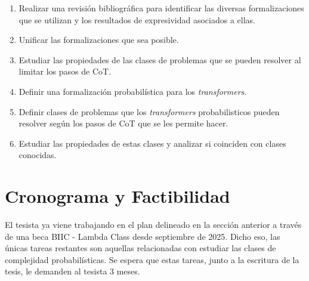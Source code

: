 \documentclass[a4paper,8pt]{article} %
\begin{document}
\begin{enumerate}
    \item Realizar una revisión bibliográfica para identificar las diversas formalizaciones que se utilizan y los resultados de expresividad asociados a ellas.
    \item Unificar las formalizaciones que sea posible.
    \item Estudiar las propiedades de las clases de problemas que se pueden resolver al limitar los pasos de CoT.
    \item Definir una formalización probabilística para los \textit{transformers}.
    \item Definir clases de problemas que los \textit{transformers} probabilisticos pueden resolver según los pasos de CoT que se les permite hacer.
    \item Estudiar las propiedades de estas clases y analizar si coinciden con clases conocidas.
\end{enumerate}

\section*{\Large Cronograma y Factibilidad}

El tesista ya viene trabajando en el plan delineado en la sección anterior a través de una beca BIIC - Lambda Class desde septiembre de 2025. 
Dicho eso, las únicas tareas restantes son aquellas relacionadas con estudiar las clases de complejidad probabilísticas.
Se espera que estas tareas, junto a la escritura de la tesis, le demanden al tesista 3 meses.



\vspace{1em}

\renewcommand{\section}[2]{}%

{\small 

\thispagestyle{empty}
}
\end{document}
